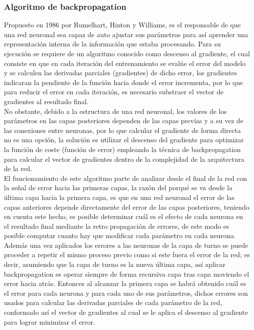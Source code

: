 \subsubsection{Algoritmo de backpropagation}
Propuesto en 1986 por Rumelhart, Hinton y Williams, es el responsable de que una red neuronal sea capaz de auto ajustar sus parámetros para así aprender una representación interna de la información que estaba procesando. Para su ejecución se requiere de un algoritmo conocido como descenso al gradiente, el cual consiste en que en cada iteración del entrenamiento se evalúe el error del modelo y se calculen las derivadas parciales (gradientes) de dicho error, los gradientes indicaran la pendiente de la función hacia donde el error incrementa, por lo que para reducir el error en cada iteración, es necesario substraer el vector de gradientes al resultado final. 
\\
No obstante, debido a la estructura de una red neuronal, los valores de los parámetros en las capas posteriores dependen de las capas previas y a su vez de las conexiones entre neuronas, por lo que calcular el gradiente de forma directa no es una opción, la solución es utilizar el descenso del gradiente para optimizar la función de coste (función de error) empleando la técnica de backpropagation para calcular el vector de gradientes dentro de la complejidad de la arquitectura de la red. 
\\
El funcionamiento de este algoritmo parte de analizar desde el final de la red con la señal de error hacia las primeras capas, la razón del porqué se va desde la última capa hacia la primera capa, es que en una red neuronal el error de las capas anteriores depende directamente del error de las capas posteriores, teniendo en cuenta este hecho, es posible determinar cuál es el efecto de cada neurona en el resultado final mediante la retro propagación de errores, de este modo es posible computar cuanto hay que modificar cada parámetro en cada neurona. Además una vez aplicados los errores a las neuronas de la capa de turno se puede proceder a repetir el mismo proceso previo como si este fuera el error de la red; es decir, asumiendo que la capa de turno es la nueva última capa, así aplicar backpropagation es operar siempre de forma recursiva capa tras capa moviendo el error hacia atrás. Entonces al alcanzar la primera capa se habrá obtenido cuál es el error para cada neurona y para cada uno de sus parámetros, dichos errores son usados para calcular las derivadas parciales de cada parámetro de la red, conformado así el vector de gradientes al cual se le aplica el descenso al gradiente para lograr minimizar el error. 
